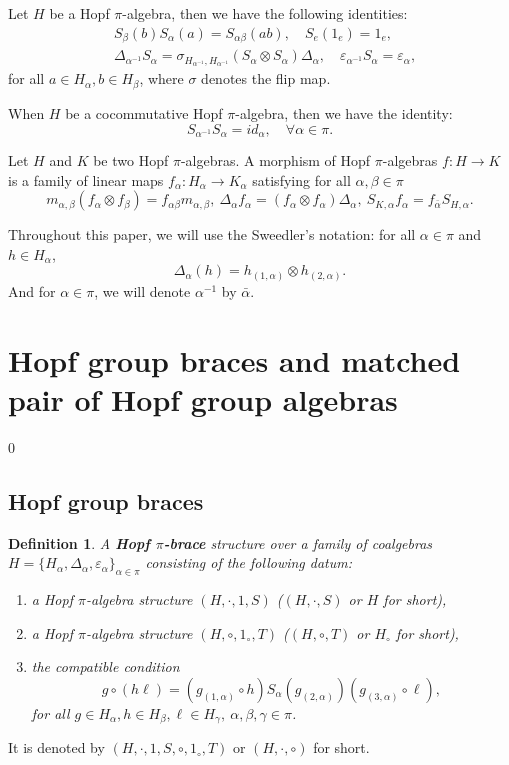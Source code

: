 \documentclass[11pt]{article}
\def\a{\alpha}
\def\b{\beta}
\def\g{\gamma}
\def\o{\otimes}
\def\v{\varepsilon}
\newtheorem{definition}[theorem]{Definition}
\begin{document}
Let $H$ be a Hopf $\pi$-algebra, then we have the following identities:
\begin{align*}
&S_\b(b)S_\a(a)=S_{\a\b}(ab),\quad S_e(1_e)=1_e,\\
&\Delta_{\a^{-1}}S_\a=\sigma_{H_{\a^{-1}},H_{\a^{-1}}}(S_\a\o S_\a)\Delta_\a,\quad \v _{\a^{-1}}S_\a=\v _\a,
\end{align*}
for all $a\in H_\a,b\in H_\b$, where $\sigma$ denotes the flip map.

When $H$ be a cocommutative Hopf $\pi$-algebra, then we have the identity:
\begin{equation*}
  S_{\a^{-1}}S_\a=id_\a, \quad  \forall\a\in\pi.
\end{equation*}

Let $H$ and $K$ be two Hopf $\pi$-algebras. A morphism of Hopf $\pi$-algebras $f:H\rightarrow K$ is a family of linear maps $f_\a:H_\a\rightarrow K_\a$ satisfying for all $\a,\b\in\pi$
$$m_{\a,\b}(f_\a\o f_\b)=f_{\a\b}m_{\a,\b},\ \Delta_\a f_\a=(f_\a\o f_\a)\Delta_\a,\ S_{K,\a} f_\a=f_{\bar{\a}}S_{H,\a}.$$

Throughout this paper, we will use the Sweedler’s notation: for all $\a\in\pi$ and $h\in H_\a$,
$$\Delta_\a(h)=h_{(1,\a)}\o h_{(2,\a)}.$$
And for $\a\in\pi$, we will denote $\a^{-1}$ by $\bar{\a}$.

\section{Hopf group braces and matched pair of Hopf group algebras}
 \def\theequation{2.\arabic{equation}}
 \setcounter{equation} {0}

\subsection{Hopf group braces}
\begin{definition}
A {\bf Hopf $\pi$-brace} structure over a family of coalgebras $H=\{H_\a,\Delta_\a,\varepsilon_\a\}_{\a\in\pi}$ consisting of the following datum:
\begin{enumerate}[\quad\rm(1)]
\item a Hopf $\pi$-algebra structure $(H, \cdot, 1, S)$ ($(H,\cdot,S)$ or $H$ for short),
\item a Hopf $\pi$-algebra structure $(H, \circ, 1_{\circ}, T)$ ($(H,\circ,T)$ or $H_{\circ}$ for short),
\item the compatible condition
\begin{equation} \label{eq:Hbrace}
g\circ(h\ell)=(g_{(1,\a)}\circ h)S_{\a}(g_{(2,\a)})(g_{(3,\a)}\circ \ell),
\end{equation}
for all $g\in H_\a,h\in H_\b,\ell\in H_\g, ~\a,\b,\g\in\pi$.
\end{enumerate}
\end{definition}
It is denoted by $(H,\cdot,1, S, \circ, 1_{\circ}, T)$ or $(H,\cdot,\circ)$ for short.
\end{document}
